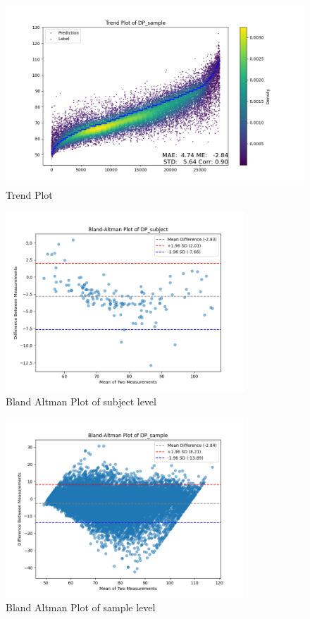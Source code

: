 \documentclass{article}
\begin{document}
\begin{figure}[H]
\centering
\includegraphics[width=\textwidth]{./Fig/Trend_Plot_DP_sample.png}
\caption{Trend Plot}
\label{fig:image1}
\end{figure}

\begin{figure}[H]
\centering
\includegraphics[width=0.8\textwidth]{./Fig/Bland_Altman_Plot_DP_subject.png}
\caption{Bland Altman Plot of subject level}
\label{fig:image2}
\end{figure}

\begin{figure}[H]
\centering
\includegraphics[width=0.8\textwidth]{./Fig/Bland_Altman_Plot_DP_sample.png}
\caption{Bland Altman Plot of sample level}
\label{fig:image2}
\end{figure}
\end{document}
